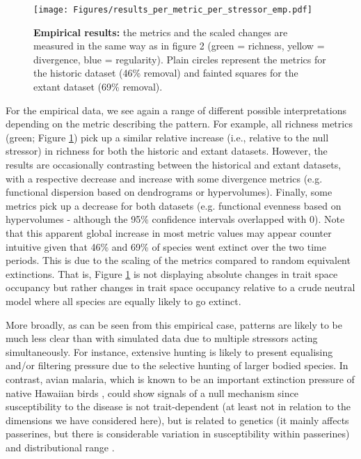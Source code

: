 \documentclass[12pt,letterpaper]{article}
\begin{document}
\begin{figure}[!htbp]
\centering
   \texttt{[image: Figures/results\_per\_metric\_per\_stressor\_emp.pdf]}
\caption{\scriptsize{\textbf{Empirical results:} the metrics and the scaled changes are measured in the same way as in figure 2 (green = richness, yellow = divergence, blue = regularity).
Plain circles represent the metrics for the historic dataset (46\% removal) and fainted squares for the extant dataset (69\% removal).
}}
\label{Fig:empirical_results}
\end{figure}
\bigskip

For the empirical data, we see again a range of different possible interpretations depending on the metric describing the pattern.
For example, all richness metrics (green; Figure \ref{Fig:empirical_results}) pick up a similar relative increase (i.e., relative to the null stressor) in richness for both the historic and extant datasets.
However, the results are occasionally contrasting between the historical and extant datasets, with a respective decrease and increase with some divergence metrics (e.g. functional dispersion based on dendrograms or hypervolumes).
Finally, some metrics pick up a decrease for both datasets (e.g. functional evenness based on hypervolumes - although the 95\% confidence intervals overlapped with 0).
Note that this apparent global increase in most metric values may appear counter intuitive given that 46\% and 69\% of species went extinct over the two time periods.
This is due to the scaling of the metrics compared to random equivalent extinctions.
That is, Figure \ref{Fig:empirical_results} is not displaying absolute changes in trait space occupancy but rather changes in trait space occupancy relative to a crude neutral model where all species are equally likely to go extinct.

More broadly, as can be seen from this empirical case, patterns are likely to be much less clear than with simulated data due to multiple stressors acting simultaneously.
For instance, extensive hunting is likely to present equalising and/or filtering pressure due to the selective hunting of larger bodied species.
In contrast, avian malaria, which is known to be an important extinction pressure of native Hawaiian birds \citep{samuel2011dynamics}, could show signals of a null mechanism since susceptibility to the disease is not trait-dependent (at least not in relation to the dimensions we have considered here), but is related to genetics (it mainly affects passerines, but there is considerable variation in susceptibility within passerines) and distributional range \citep{jessup2023wildlife}.
\end{document}
